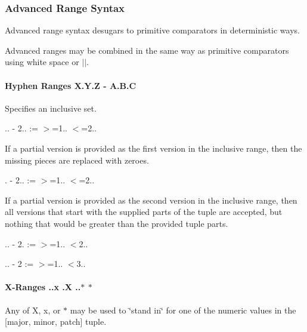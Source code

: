 \subsubsection*{Advanced Range Syntax}

Advanced range syntax desugars to primitive comparators in deterministic ways.

Advanced ranges may be combined in the same way as primitive comparators using white space or {\ttfamily $\vert$$\vert$}.

\paragraph*{Hyphen Ranges {\ttfamily X.\+Y.\+Z -\/ A.\+B.\+C}}

Specifies an inclusive set.


\begin{DoxyItemize}
\item {.. -\/ 2..} \+:= {\ttfamily $>$=1.. $<$=2..}
\end{DoxyItemize}

If a partial version is provided as the first version in the inclusive range, then the missing pieces are replaced with zeroes.


\begin{DoxyItemize}
\item {. -\/ 2..} \+:= {\ttfamily $>$=1.. $<$=2..}
\end{DoxyItemize}

If a partial version is provided as the second version in the inclusive range, then all versions that start with the supplied parts of the tuple are accepted, but nothing that would be greater than the provided tuple parts.


\begin{DoxyItemize}
\item {.. -\/ 2.} \+:= {\ttfamily $>$=1.. $<$2..}
\item {.. -\/ 2} \+:= {\ttfamily $>$=1.. $<$3..}
\end{DoxyItemize}

\paragraph*{X-\/\+Ranges {..\+x} {.\+X} {..$\ast$} {\ttfamily $\ast$}}

Any of {\ttfamily X}, {\ttfamily x}, or {\ttfamily $\ast$} may be used to \char`\"{}stand in\char`\"{} for one of the numeric values in the {\ttfamily \mbox{[}major, minor, patch\mbox{]}} tuple.


